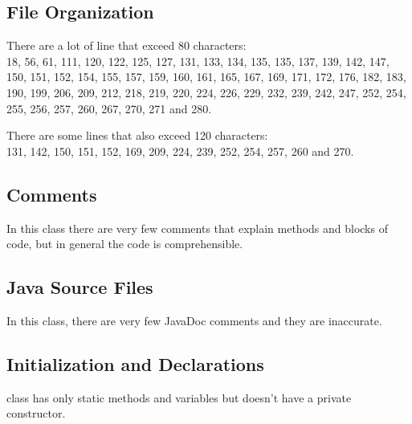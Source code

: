\subsection{File Organization}

	There are a lot of line that exceed 80 characters: \\
	18, 56, 61, 111, 120, 122, 125, 127, 131, 133, 134, 135, 135, 137, 139, 142, 147, 150, 151, 152, 154, 155, 157, 159, 160, 161, 165, 167, 169, 171, 172, 176, 182, 183, 190, 199, 206, 209, 212, 218, 219, 220, 224, 226, 229, 232, 239, 242, 247, 252, 254, 255, 256, 257, 260, 267, 270, 271 and 280. 
	
	There are some lines that also exceed 120 characters: \\
	131, 142, 150, 151, 152, 169, 209, 224, 239, 252, 254, 257, 260 and 270.
	
\subsection{Comments}

	In this class there are very few comments that explain methods and blocks of code, but in general the code is comprehensible.
	
\subsection{Java Source Files}

	In this class, there are very few JavaDoc comments and they are inaccurate.

\subsection{Initialization and Declarations}

     class has only static methods and variables but doesn't
    have a private constructor.

